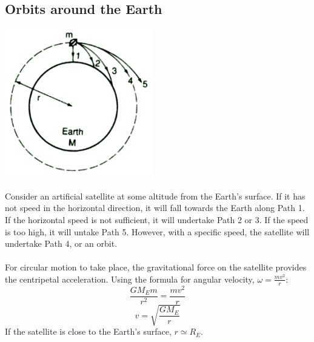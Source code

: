 \documentclass{article}
\begin{document}
\subsection{Orbits around the Earth}
\begin{center}
    \includegraphics[scale=0.6]{assets/fallLines.png}
\end{center}\leavevmode
Consider an artificial satellite at some altitude from the Earth's surface. If it has not speed in the horizontal direction, it will fall towards the Earth along Path 1. 
If the horizontal speed is not sufficient, it will undertake Path 2 or 3. If the speed is too high, it will untake Path 5. However, with a specific speed, the satellite will undertake Path 4, or an orbit.
\\
\\For circular motion to take place, the gravitational force on the satellite provides the centripetal acceleration. Using the formula for angular velocity, $\omega=\frac{mv^2}{r}$:
\begin{equation}
    \frac{GM_Em}{r^2}=\frac{mv^2}{r}
\end{equation}
\begin{equation}
    v=\sqrt{\frac{GM_E}{r}}
\end{equation}
If the satellite is close to the Earth's surface, $r\simeq R_E$.
\end{document}
